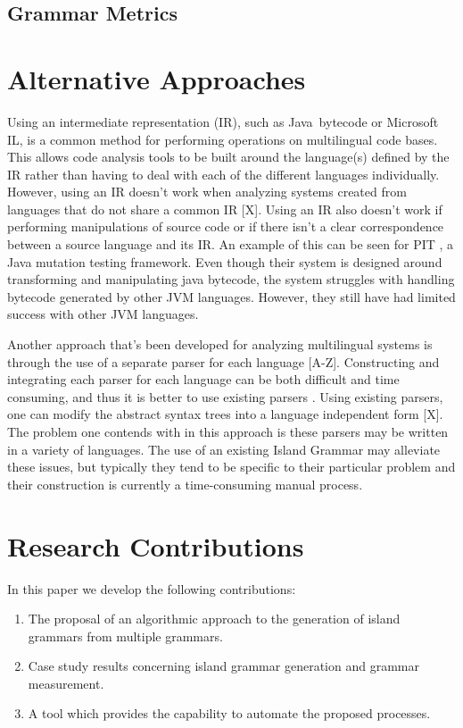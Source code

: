 \documentclass[10pt,nocc]{xrese_report}
\begin{document}
\subsection{Grammar Metrics}

\section{Alternative Approaches}\label{sec:related}

Using an intermediate representation (IR), such as Java\texttrademark\ bytecode or Microsoft IL, is a common method for performing operations on multilingual code bases. This allows code analysis tools to be built around the language(s) defined by the IR rather than having to deal with each of the different languages individually. However, using an IR doesn't work when analyzing systems created from languages that do not share a common IR [X]. Using an IR also doesn't work if performing manipulations of source code or if there isn't a clear correspondence between a source language and its IR. An example of this can be seen for PIT \cite{coles_pit:_2016}, a Java mutation testing framework. Even though their system is designed around transforming and manipulating java bytecode, the system struggles with handling bytecode generated by other JVM languages. However, they still have had limited success with other JVM languages.

Another approach that's been developed for analyzing multilingual systems is through the use of a separate parser for each language [A-Z]. Constructing and integrating each parser for each language can be both difficult and time consuming, and thus it is better to use existing parsers \cite{petrinja_how_2013}. Using existing parsers, one can modify the abstract syntax trees into a language independent form [X]. The problem one contends with in this approach is these parsers may be written in a variety of languages. The use of an existing Island Grammar\cite{synytskyy_robust_2003} may alleviate these issues, but typically they tend to be specific to their particular problem and their construction is currently a time-consuming manual process.

\section{Research Contributions}

In this paper we develop the following contributions:

\begin{enumerate}
 \item The proposal of an algorithmic approach to the generation of island grammars from multiple grammars.
 \item Case study results concerning island grammar generation and grammar measurement.
 \item A tool which provides the capability to automate the proposed processes.
\end{enumerate}
\end{document}
